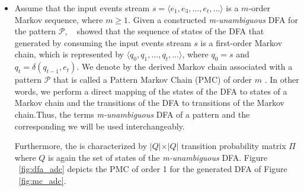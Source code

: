 \begin{itemize}[noitemsep]



\item Assume that the input events stream $s=\langle e_1,e_3,...,e_t,...\rangle$ is a $m$-order Markov sequence, where $m \geq 1$.  Given a constructed \textit{m-unambiguous} DFA for the pattern $\mathcal{P}$, ~\citet{nuel_pattern_2008} showed that the sequence of states of the DFA that generated by consuming the input events stream $s$ is a first-order Markov chain, which is represented by $\langle q_{0},q_{1},...,q_{t},...\rangle$, where $q_{0}=s$ and $q_{t}=\delta(q_{t-1},e_{t})$. We denote by \pmcmr  the derived Markov chain associated with a pattern $\mathcal{P}$ that is called a Pattern Markov Chain (PMC) of order $m$  \cite{nuel_pattern_2008}. In other words, we perform a direct mapping of the states of the DFA to states of a Markov chain and the transitions of the DFA to transitions of the Markov chain.Thus, the terms \textit{m-unambiguous} DFA of a pattern and the corresponding \pmcmr  we will be used interchangeably. 

\par Furthermore, the \pmcmr is characterized by $\vert Q \vert \times \vert Q \vert$ transition probability matrix $\Pi$ where $Q$ is again the set of states of the  \textit{m-unambiguous} DFA. Figure ~\ref{fig:dfa_adc} depicts the PMC of order 1 for the generated DFA of Figure ~\ref{fig:mc_adc}.

 
\end{itemize}


